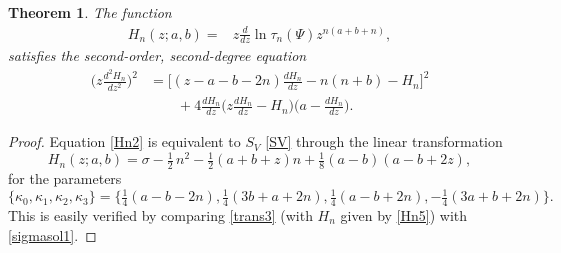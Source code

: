 \documentclass[12pt]{article}
\newtheorem{mydef}{Theorem}[section]
\numberwithin{figure}{section}
\numberwithin{equation}{section}
\numberwithin{table}{section}
\begin{document}
\begin{mydef}
The function
\begin{align}
H_n(z; a, b)=&z\frac{d}{dz}\ln\tau_n(\Psi)z^{n( a+ b+n)},\label{Hn5}
\end{align}
satisfies the second-order, second-degree equation
\begin{align}\nonumber
\bigg(z\frac{d^2H_n}{dz^2}\bigg)^2&=\bigg[(z-a-b-2n)\frac{dH_n}{dz}-n(n+b)-H_n\bigg]^2\\
&\qquad+4\frac{dH_n}{dz}\bigg(z
\frac{dH_n}{dz}-H_n\bigg)\bigg( a-\frac{dH_n}{dz}\bigg).\label{Hn2}
\end{align}
\end{mydef}
\begin{proof}
Equation \eqref{Hn2} is equivalent to $S_V$ \eqref{SV} through the linear transformation
\begin{equation}
H_n(z; a, b)=\sigma-\tfrac{1}{2}\,{n}^{2}- \tfrac{1}{2}(  a+ b+z) n+ \tfrac{1}{8}(  a- b)( a- b+2z),\label{trans3}
\end{equation}
for the parameters
\begin{equation}
\{\kappa_0,\kappa_1,\kappa_2,\kappa_3\}=\{\tfrac{1}{4}( a- b-2n),\tfrac{1}{4}(3 b+ a+2n),\tfrac{1}{4}( a- b+2n),-\tfrac{1}{4}(3 a+ b+2n)\}.\label{p2}
\end{equation}
This is easily verified by comparing \eqref{trans3} (with $H_n$ given by \eqref{Hn5}) with \eqref{sigmasol1}.
\end{proof}
\end{document}
